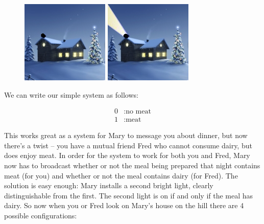 \documentclass{book}
\begin{document}
\begin{figure}[H]
\centering
\begin{minipage}{.5\textwidth}
  \centering
  \includegraphics[width=.5\linewidth]{house_on_hill_0}
\end{minipage}%
\begin{minipage}{.5\textwidth}
  \centering
  \includegraphics[width=.5\linewidth]{house_on_hill_1}
\end{minipage}
\end{figure}

We can write our simple system as follows:

\begin{align*}
	0&: \text{no meat} \\
	1&: \text{meat}
\end{align*}

This works great as a system for Mary to message you about dinner, but now there's a twist -- you have a mutual friend Fred who cannot consume dairy, but does enjoy meat. In order for the system to work for both you and Fred, Mary now has to broadcast whether or not the meal being prepared that night contains meat (for you) and whether or not the meal contains dairy (for Fred). The solution is easy enough: Mary installs a second bright light, clearly distinguishable from the first. The second light is on if and only if the meal has dairy. So now when you or Fred look on Mary's house on the hill there are 4 possible configurations:
\end{document}
